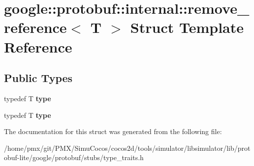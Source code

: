 \hypertarget{structgoogle_1_1protobuf_1_1internal_1_1remove__reference}{}\section{google\+:\+:protobuf\+:\+:internal\+:\+:remove\+\_\+reference$<$ T $>$ Struct Template Reference}
\label{structgoogle_1_1protobuf_1_1internal_1_1remove__reference}
\subsection*{Public Types}
\begin{DoxyCompactItemize}
\item 
\mbox{\label{structgoogle_1_1protobuf_1_1internal_1_1remove__reference_a4eea7af17ff3704b06b313bc12632ad2}} 
typedef T {\bfseries type}
\item 
\mbox{\label{structgoogle_1_1protobuf_1_1internal_1_1remove__reference_a4eea7af17ff3704b06b313bc12632ad2}} 
typedef T {\bfseries type}
\end{DoxyCompactItemize}


The documentation for this struct was generated from the following file\+:\begin{DoxyCompactItemize}
\item 
/home/pmx/git/\+P\+M\+X/\+Simu\+Cocos/cocos2d/tools/simulator/libsimulator/lib/protobuf-\/lite/google/protobuf/stubs/type\+\_\+traits.\+h\end{DoxyCompactItemize}
